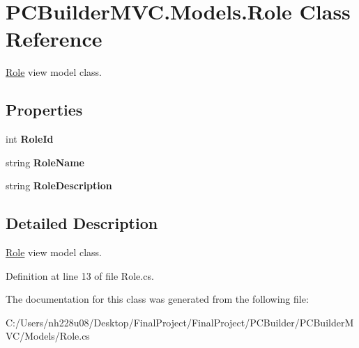 \hypertarget{class_p_c_builder_m_v_c_1_1_models_1_1_role}{}\section{P\+C\+Builder\+M\+V\+C.\+Models.\+Role Class Reference}
\label{class_p_c_builder_m_v_c_1_1_models_1_1_role}


\hyperlink{class_p_c_builder_m_v_c_1_1_models_1_1_role}{Role} view model class.  


\subsection*{Properties}
\begin{DoxyCompactItemize}
\item 
int {\bfseries Role\+Id}\hypertarget{class_p_c_builder_m_v_c_1_1_models_1_1_role_a54894e076feb6b9c47bc35b80852f10f}{}\label{class_p_c_builder_m_v_c_1_1_models_1_1_role_a54894e076feb6b9c47bc35b80852f10f}

\item 
string {\bfseries Role\+Name}\hypertarget{class_p_c_builder_m_v_c_1_1_models_1_1_role_ae256433056a0fe154c30f4a5f3ab3c9e}{}\label{class_p_c_builder_m_v_c_1_1_models_1_1_role_ae256433056a0fe154c30f4a5f3ab3c9e}

\item 
string {\bfseries Role\+Description}\hypertarget{class_p_c_builder_m_v_c_1_1_models_1_1_role_a4c00642714f2e84604864cb2c7d91e8c}{}\label{class_p_c_builder_m_v_c_1_1_models_1_1_role_a4c00642714f2e84604864cb2c7d91e8c}

\end{DoxyCompactItemize}


\subsection{Detailed Description}
\hyperlink{class_p_c_builder_m_v_c_1_1_models_1_1_role}{Role} view model class. 



Definition at line 13 of file Role.\+cs.



The documentation for this class was generated from the following file\+:\begin{DoxyCompactItemize}
\item 
C\+:/\+Users/nh228u08/\+Desktop/\+Final\+Project/\+Final\+Project/\+P\+C\+Builder/\+P\+C\+Builder\+M\+V\+C/\+Models/Role.\+cs\end{DoxyCompactItemize}
